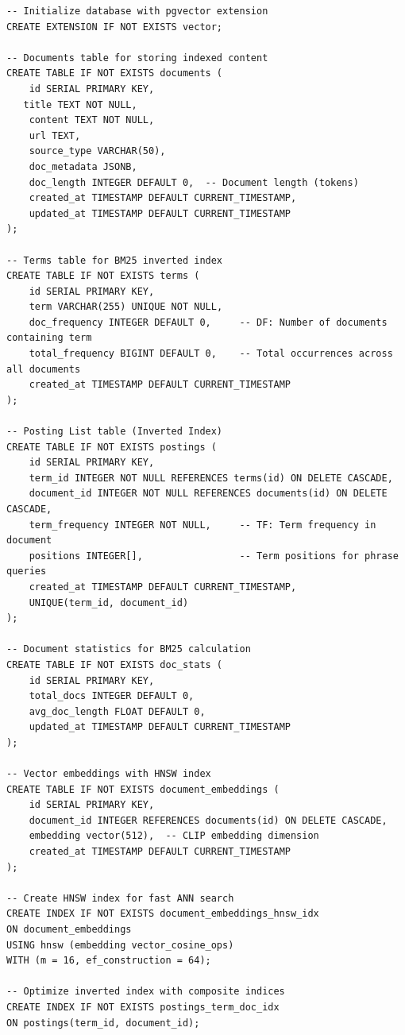 \begin{lstlisting}
-- Initialize database with pgvector extension
CREATE EXTENSION IF NOT EXISTS vector;

-- Documents table for storing indexed content
CREATE TABLE IF NOT EXISTS documents (
    id SERIAL PRIMARY KEY,
   title TEXT NOT NULL,
    content TEXT NOT NULL,
    url TEXT,
    source_type VARCHAR(50),
    doc_metadata JSONB,
    doc_length INTEGER DEFAULT 0,  -- Document length (tokens)
    created_at TIMESTAMP DEFAULT CURRENT_TIMESTAMP,
    updated_at TIMESTAMP DEFAULT CURRENT_TIMESTAMP
);

-- Terms table for BM25 inverted index
CREATE TABLE IF NOT EXISTS terms (
    id SERIAL PRIMARY KEY,
    term VARCHAR(255) UNIQUE NOT NULL,
    doc_frequency INTEGER DEFAULT 0,     -- DF: Number of documents containing term
    total_frequency BIGINT DEFAULT 0,    -- Total occurrences across all documents
    created_at TIMESTAMP DEFAULT CURRENT_TIMESTAMP
);

-- Posting List table (Inverted Index)
CREATE TABLE IF NOT EXISTS postings (
    id SERIAL PRIMARY KEY,
    term_id INTEGER NOT NULL REFERENCES terms(id) ON DELETE CASCADE,
    document_id INTEGER NOT NULL REFERENCES documents(id) ON DELETE CASCADE,
    term_frequency INTEGER NOT NULL,     -- TF: Term frequency in document
    positions INTEGER[],                 -- Term positions for phrase queries
    created_at TIMESTAMP DEFAULT CURRENT_TIMESTAMP,
    UNIQUE(term_id, document_id)
);

-- Document statistics for BM25 calculation
CREATE TABLE IF NOT EXISTS doc_stats (
    id SERIAL PRIMARY KEY,
    total_docs INTEGER DEFAULT 0,
    avg_doc_length FLOAT DEFAULT 0,
    updated_at TIMESTAMP DEFAULT CURRENT_TIMESTAMP
);

-- Vector embeddings with HNSW index
CREATE TABLE IF NOT EXISTS document_embeddings (
    id SERIAL PRIMARY KEY,
    document_id INTEGER REFERENCES documents(id) ON DELETE CASCADE,
    embedding vector(512),  -- CLIP embedding dimension
    created_at TIMESTAMP DEFAULT CURRENT_TIMESTAMP
);

-- Create HNSW index for fast ANN search
CREATE INDEX IF NOT EXISTS document_embeddings_hnsw_idx 
ON document_embeddings 
USING hnsw (embedding vector_cosine_ops)
WITH (m = 16, ef_construction = 64);

-- Optimize inverted index with composite indices
CREATE INDEX IF NOT EXISTS postings_term_doc_idx 
ON postings(term_id, document_id);
\end{lstlisting}

